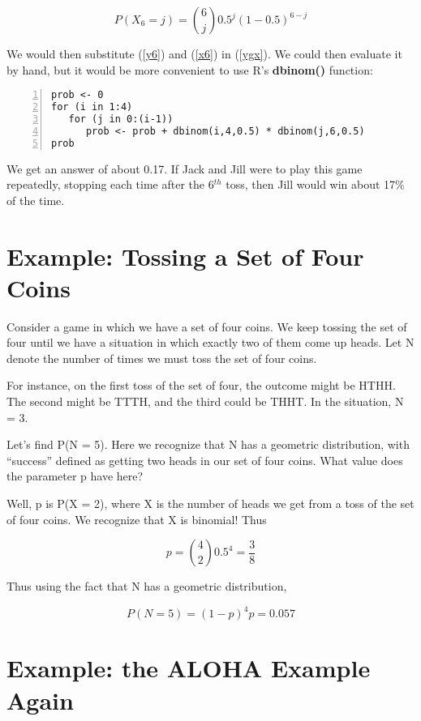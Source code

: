 \begin{equation}
\label{x6}
P(X_6 = j) = \binom{6}{j} 0.5^j (1-0.5)^{6-j}  
\end{equation}

We would then substitute (\ref{y6}) and (\ref{x6}) in (\ref{ygx}).  We
could then evaluate it by hand, but it would be more convenient to use
R's {\bf dbinom()} function:

\begin{Verbatim}[fontsize=\relsize{-2},numbers=left]
prob <- 0
for (i in 1:4)
   for (j in 0:(i-1))
      prob <- prob + dbinom(i,4,0.5) * dbinom(j,6,0.5)
prob
\end{Verbatim}

We get an answer of about 0.17.  If Jack and Jill were to play this game
repeatedly, stopping each time after the 6$^{th}$ toss, then Jill
would win about 17\% of the time.

\section{Example:  Tossing a Set of Four Coins}

Consider a game in which we have a set of four coins.  We keep tossing
the set of four until we have a situation in which exactly two of them
come up heads.  Let N denote the number of times we must toss the set of
four coins.

For instance, on the first toss of the set of four, the outcome might be
HTHH.  The second might be TTTH, and the third could be THHT.  In the
situation, N = 3.

Let's find P(N = 5).  Here we recognize that N has a geometric
distribution, with ``success'' defined as getting two heads in our set
of four coins.  What value does the parameter p have here?  

Well, p is P(X = 2), where X is the number of heads we get from a toss
of the set of four coins.  We recognize that X is binomial!  Thus

\begin{equation}
p = \binom{4}{2} 0.5^4 = \frac{3}{8}
\end{equation}

Thus using the fact that N has a geometric distribution,

\begin{equation}
P(N = 5) = (1-p)^4 p = 0.057
\end{equation}

\section{Example:  the ALOHA Example Again}
\label{alohaagain}

